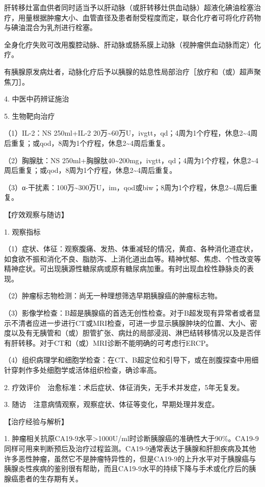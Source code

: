 肝转移灶富血供者同时适当予以肝动脉（或肝转移灶供血动脉）超液化碘油栓塞治疗，用量根据肿瘤大小、血管直径及患者耐受程度而定，联合化疗者可将化疗药物与碘油混合为乳剂进行栓塞。

全身化疗失败可改用腹腔动脉、肝动脉或肠系膜上动脉（视肿瘤供血动脉而定）化疗。

有胰腺原发病灶者，动脉化疗后予以胰腺的姑息性局部治疗［放疗和（或）超声聚焦刀］。

4. 中医中药辨证施治

5. 生物靶向治疗

（1）IL-2：NS 250ml+IL-2
20万\textasciitilde{}60万U，ivgtt，qd；4周为1个疗程，休息2\textasciitilde{}4周后重复；或qod，8周为1个疗程，休息2\textasciitilde{}4周后重复。

（2）胸腺肽：NS
250ml+胸腺肽40\textasciitilde{}200mg，ivgtt，qd；4周为1个疗程，休息2\textasciitilde{}4周后重复；或qod，8周为1个疗程，休息2\textasciitilde{}4周后重复。

（3）α-干扰素：100万\textasciitilde{}300万U，im，qod或biw；8周为1个疗程，休息2\textasciitilde{}4周后重复。

【疗效观察与随访】

1. 观察指标

（1）症状、体征：观察腹痛、发热、体重减轻的情况，黄疸、各种消化道症状，如食欲不振和消化不良、脂肪泻、上消化道出血等。精神忧郁、焦虑、个性改变等精神症状。可出现胰源性糖尿病或原有糖尿病加重。有时出现血栓性静脉炎的表现。

（2）肿瘤标志物检测：尚无一种理想筛选早期胰腺癌的肿瘤标志物。

（3）影像学检查：B超是胰腺癌的首选无创性检查。对于B超发现有异常者或者显示不清者应进一步进行CT或MRI检查，可进一步显示胰腺肿块的位置、大小、密度以及有无胰管和（或）胆管扩张、病灶的局部浸润、淋巴结转移情况以及是否伴有肝转移。对于CT和（或）MRI诊断不能明确的可考虑行ERCP。

（4）组织病理学和细胞学检查：在CT、B超定位和引导下，或在剖腹探查中用细针穿刺作多处细胞学或活体组织检查，确诊率高。

2. 疗效评价　治愈标准：术后症状、体征消失，无手术并发症，5年无复发。

3. 随访　注意病情观察，观察症状、体征等变化，早期处理并发症。

【治疗经验与解析】

1.
肿瘤相关抗原CA19-9水平\textgreater{}1000U/ml时诊断胰腺癌的准确性大于90\%。CA19-9同样可用来判断预后及治疗过程监测。CA19-9通常表达于胰腺和肝胆疾病及其他许多恶性肿瘤，虽然它不是肿瘤特异性的，但是CA19-9的上升水平对于胰腺癌与胰腺炎性疾病的鉴别很有帮助，而且CA19-9水平的持续下降与手术或化疗后的胰腺癌患者的生存期有关。

